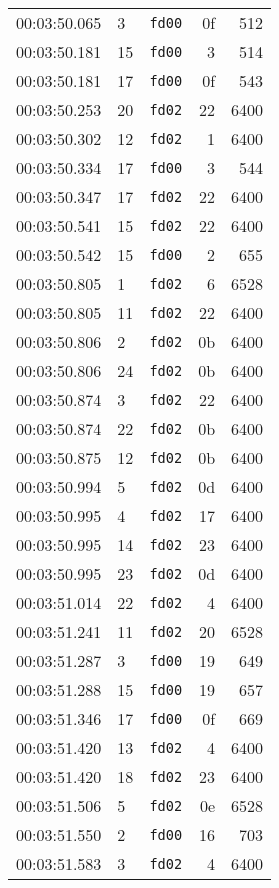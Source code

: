 \documentclass{article}
\begin{document}
\begin{longtable}{lllrr}
00:03:50.065 & 3 & \texttt{fd00} & 0f & 512 \\
00:03:50.181 & 15 & \texttt{fd00} & 3 & 514 \\
00:03:50.181 & 17 & \texttt{fd00} & 0f & 543 \\
00:03:50.253 & 20 & \texttt{fd02} & 22 & 6400 \\
00:03:50.302 & 12 & \texttt{fd02} & 1 & 6400 \\
00:03:50.334 & 17 & \texttt{fd00} & 3 & 544 \\
00:03:50.347 & 17 & \texttt{fd02} & 22 & 6400 \\
00:03:50.541 & 15 & \texttt{fd02} & 22 & 6400 \\
00:03:50.542 & 15 & \texttt{fd00} & 2 & 655 \\
00:03:50.805 & 1 & \texttt{fd02} & 6 & 6528 \\
00:03:50.805 & 11 & \texttt{fd02} & 22 & 6400 \\
00:03:50.806 & 2 & \texttt{fd02} & 0b & 6400 \\
00:03:50.806 & 24 & \texttt{fd02} & 0b & 6400 \\
00:03:50.874 & 3 & \texttt{fd02} & 22 & 6400 \\
00:03:50.874 & 22 & \texttt{fd02} & 0b & 6400 \\
00:03:50.875 & 12 & \texttt{fd02} & 0b & 6400 \\
00:03:50.994 & 5 & \texttt{fd02} & 0d & 6400 \\
00:03:50.995 & 4 & \texttt{fd02} & 17 & 6400 \\
00:03:50.995 & 14 & \texttt{fd02} & 23 & 6400 \\
00:03:50.995 & 23 & \texttt{fd02} & 0d & 6400 \\
00:03:51.014 & 22 & \texttt{fd02} & 4 & 6400 \\
00:03:51.241 & 11 & \texttt{fd02} & 20 & 6528 \\
00:03:51.287 & 3 & \texttt{fd00} & 19 & 649 \\
00:03:51.288 & 15 & \texttt{fd00} & 19 & 657 \\
00:03:51.346 & 17 & \texttt{fd00} & 0f & 669 \\
00:03:51.420 & 13 & \texttt{fd02} & 4 & 6400 \\
00:03:51.420 & 18 & \texttt{fd02} & 23 & 6400 \\
00:03:51.506 & 5 & \texttt{fd02} & 0e & 6528 \\
00:03:51.550 & 2 & \texttt{fd00} & 16 & 703 \\
00:03:51.583 & 3 & \texttt{fd02} & 4 & 6400 \\

\end{longtable}
\end{document}
